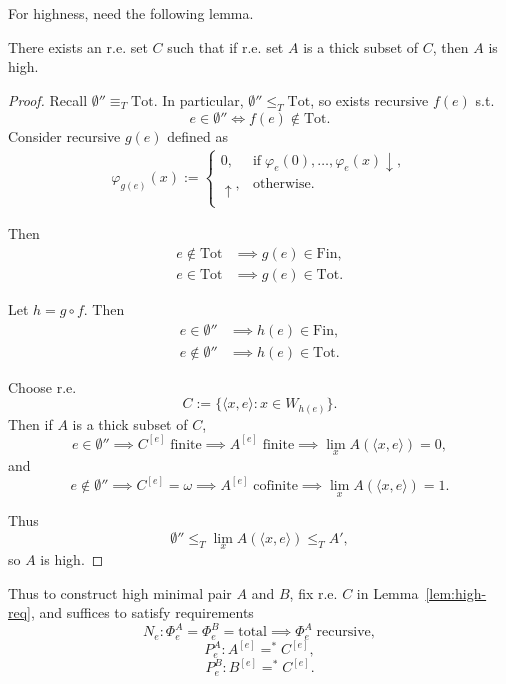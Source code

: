   For highness, need the following lemma.
  \begin{lemma}
    \label{lem:high-req}
    There exists an r.e. set $C$ such that if r.e. set $A$ is a thick
    subset of $C$, then $A$ is high.
  \end{lemma}
  \begin{proof}
    Recall $\emptyset''\equiv_T\text{Tot}$. In
    particular, $\emptyset''\leq_T\text{Tot}$, so exists recursive $f(e)$
    s.t.
    \[e\in\emptyset'' \Leftrightarrow f(e)\not\in\text{Tot}.\]
    Consider recursive $g(e)$ defined as
    \begin{align*}
      \varphi_{g(e)}(x) :=
      \begin{cases}
        0, &\text{if}\; \varphi_e(0),\ldots,\varphi_e(x)\downarrow,\\
        \uparrow, &\text{otherwise}.\\
      \end{cases}
    \end{align*}

    Then
    \begin{align*}
      e\not\in\text{Tot} &\implies g(e)\in\text{Fin},\\
      e\in\text{Tot} &\implies g(e)\in\text{Tot}.
    \end{align*}

    Let $h=g\circ f$. Then
    \begin{align*}
      e\in\emptyset'' &\implies h(e)\in\text{Fin},\\
      e\not\in\emptyset'' &\implies h(e)\in\text{Tot}.
    \end{align*}

    Choose r.e.
    \[C :=\{\langle x,e\rangle: x\in W_{h(e)}\}.\]
    Then if $A$ is a thick subset of $C$,
    \[e\in\emptyset'' \implies C^{[e]}\; \text{finite} \implies A^{[e]}\;
    \text{finite} \implies \lim_x A(\langle x,e\rangle)=0,\]
    and
    \[e\not\in\emptyset'' \implies C^{[e]}=\omega \implies A^{[e]}\;
    \text{cofinite} \implies \lim_x A(\langle x,e\rangle)=1.\]

    Thus
    \[\emptyset''\leq_T \lim_x A(\langle x,e\rangle) \leq_T A',\]
    so $A$ is high.
  \end{proof}

  Thus to construct high minimal pair $A$ and $B$, fix r.e. $C$ in
  Lemma~\ref{lem:high-req}, and suffices to satisfy requirements
  \[N_e: \Phi_e^A=\Phi_e^B=\text{total} \implies \Phi_e^A\;
  \text{recursive},\]
  \[P_e^A: A^{[e]} =^* C^{[e]},\]
  \[P_e^B: B^{[e]} =^* C^{[e]}.\]

